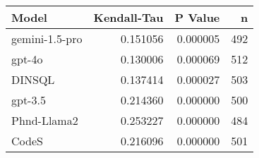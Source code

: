 \begin{tabular}{lrrr}
\toprule
Model & Kendall-Tau & P Value & n \\
\midrule
gemini-1.5-pro & 0.151056 & 0.000005 & 492 \\
gpt-4o & 0.130006 & 0.000069 & 512 \\
DINSQL & 0.137414 & 0.000027 & 503 \\
gpt-3.5 & 0.214360 & 0.000000 & 500 \\
Phnd-Llama2 & 0.253227 & 0.000000 & 484 \\
CodeS & 0.216096 & 0.000000 & 501 \\
\bottomrule
\end{tabular}
